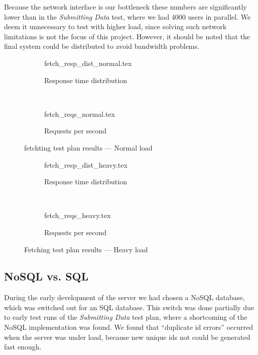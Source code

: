 Because the network interface is our bottleneck these numbers are significantly lower than in the \textit{Submitting Data} test, where we had 4000 users in parallel.
We deem it unnecessary to test with higher load, since solving such network limitations is not the focus of this project.
However, it should be noted that the final system could be distributed to avoid bandwidth problems.

\begin{figure}[!htb]
    \centering
    \begin{subfigure}[b]{\textwidth}
        \footnotesize
        \centering
        {fetch_resp_dist_normal.tex}
        \caption{Response time distribution}\label{fig:fetch_resp_t_dist_normal}
    \end{subfigure}\\
    \begin{subfigure}[b]{\textwidth}
        \footnotesize
        \centering
        {fetch_reqs_normal.tex}
        \caption{Requests per second}\label{fig:fetch_reqs_p_sec_normal}
    \end{subfigure}
    \caption{fetchting test plan results --- Normal load}\label{fig:fetch_test_results_normal}
\end{figure}
\begin{figure}[!htb]
    \begin{subfigure}[b]{\textwidth}
        \footnotesize
        \centering
        {fetch_resp_dist_heavy.tex}
        \caption{Response time distribution}\label{fig:fetch_resp_t_dist_heavy}
    \end{subfigure}\\
    \begin{subfigure}[b]{\textwidth}
        \footnotesize
        \centering
        {fetch_reqs_heavy.tex}
        \caption{Requests per second}\label{fig:fetch_reqs_p_sec_heavy}
    \end{subfigure}
    \caption{Fetching test plan results --- Heavy load}\label{fig:fetch_test_results_heavy}
\end{figure}

\subsection{NoSQL vs. SQL}\label{subsec:nosql_vs._sql}
During the early development of the server we had chosen a NoSQL database, which was switched out for an SQL database.
This switch was done partially due to early test runs of the \textit{Submitting Data} test plan, where a shortcoming of the NoSQL implementation was found.
We found that \enquote{duplicate id errors} occurred when the server was under load, because new unique ids not could be generated fast enough.

